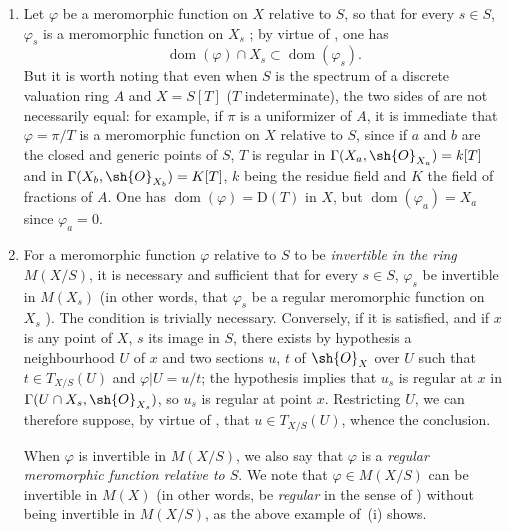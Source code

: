 \begin{remarks}[20.6.5]
\label{IV.20.6.5}
\begin{enumerate}[label=(\roman*)]
  \item Let $\varphi$ be a meromorphic function on $X$ relative to $S$, so that for every $s\in S$, $\varphi_s$ is a meromorphic function on $X_s$ ;
  by virtue of , one has
  \[
  \label{IV.20.6.5.1}
    \operatorname{dom}(\varphi)\cap X_s\subset\operatorname{dom}(\varphi_s).
    \tag{20.6.5.1}
  \]
  But it is worth noting that even when $S$ is the spectrum of a discrete valuation ring $A$ and $X=S[T]$ ($T$ indeterminate), the two sides of  are not necessarily equal:
  for example, if $\pi$ is a uniformizer of $A$, it is immediate that $\varphi=\pi/T$ is a meromorphic function on $X$ relative to $S$, since if $a$ and $b$ are the closed and generic points of $S$, $T$ is regular in $\Gamma(X_a,\sh{O}_{X_a})=k[T]$ and in $\Gamma(X_b,\sh{O}_{X_b})=K[T]$, $k$ being the residue field and $K$ the field of fractions of $A$.
  One has $\operatorname{dom}(\varphi)=\mathrm{D}(T)$ in $X$, but $\operatorname{dom}(\varphi_a)=X_a$ since $\varphi_a=0$.

  \item For a meromorphic function $\varphi$ relative to $S$ to be \emph{invertible in the ring} $M(X/S)$, it is necessary and sufficient that for every $s\in S$, $\varphi_s$ be invertible in $M(X_s)$ (in other words, that $\varphi_s$ be a regular meromorphic function on $X_s$ ).
  The condition is
  trivially necessary.
  Conversely, if it is satisfied, and if $x$ is any point of $X$, $s$ its image in $S$, there exists by hypothesis a neighbourhood $U$ of $x$ and two sections $u$, $t$ of $\sh{O}_X$ over $U$ such that $t\in T_{X/S}(U)$ and $\varphi|U=u/t$;
  the hypothesis implies that $u_s$ is regular at $x$ in $\Gamma(U\cap X_s,\sh{O}_{X_s})$, so $u_s$ is regular at point $x$.
  Restricting $U$, we can therefore suppose, by virtue of , that $u\in T_{X/S}(U)$, whence the conclusion.

  When $\varphi$ is invertible in $M(X/S)$, we also say that $\varphi$ is a \emph{regular meromorphic function relative to $S$}.
  We note that $\varphi\in M(X/S)$ can be invertible in $M(X)$ (in other words, be \emph{regular} in the sense of ) without being invertible in $M(X/S)$, as the above example of~(i) shows.


\end{enumerate}
\end{remarks}
